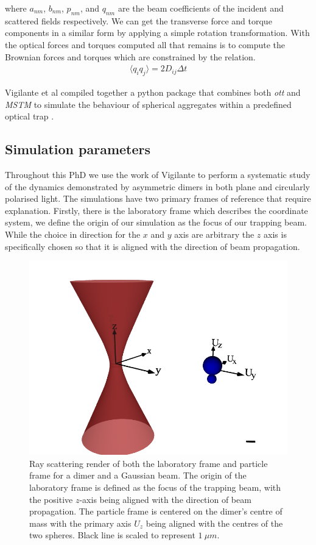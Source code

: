 where $a_{nm}$, $b_{nm}$, $p_{nm}$, and $q_{nm}$ are the beam coefficients
of the incident and scattered fields respectively. We can get the transverse 
force and torque components in a similar form by applying a simple rotation 
transformation. With the optical forces and torques computed all that remains
is to compute the Brownian forces and torques which are constrained by the relation.
\begin{align}
	\langle q_iq_j\rangle =2D_{ij}\Delta t
\end{align}

Vigilante et al compiled together a python package that combines both \textit{ott} 
and \textit{MSTM} to simulate the behaviour of spherical aggregates within 
a predefined optical trap \cite{Vigilante2020}. 

\subsection{Simulation parameters}
Throughout this PhD we use the work of Vigilante to perform a systematic 
study of the dynamics demonstrated by asymmetric dimers in both plane and 
circularly polarised light. The simulations have two primary frames of 
reference that require explanation. Firstly, there is the laboratory frame 
which describes the coordinate system, we define the origin of our simulation
as the focus of our trapping beam. While the choice in direction for the $x$ 
and $y$ axis are arbitrary the $z$ axis is specifically chosen so that it is 
aligned with the direction of beam propagation. 
\begin{figure}[h!]
	\centering
	\includegraphics[width=0.6\linewidth]{lab_frame.png}
	\caption{Ray scattering render of both the laboratory frame and particle 
		frame for a dimer and a Gaussian beam. The origin of the laboratory 
		frame is defined as the focus of the trapping beam, with the positive 
		$z$-axis being aligned with the direction of beam propagation. The 
		particle frame is centered on the dimer's centre of mass with the 
		primary axis $U_z$ being aligned with the centres of the two spheres.
		Black line is scaled to represent $1\ \mu m$.}
	\label{fig:lab_frame} 
\end{figure} 


